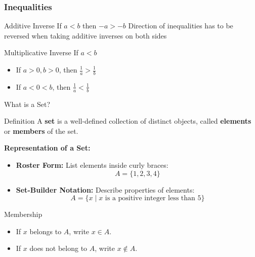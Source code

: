 \documentclass{beamer}
\begin{document}
\begin{frame}
  \frametitle{Inequalities}
  \begin{block}{Additive Inverse}
    If \( a < b \) then \( -a > -b \)
    Direction of inequalities has to be reversed when taking additive inverses on both sides 
  \end{block}
  \begin{block}{Multiplicative Inverse}
    If \( a < b \) 
    \begin{itemize}
      \item If \(a > 0, b > 0\), then \(\frac{1}{a} > \frac{1}{b} \)
      \item If \(a < 0 < b\), then \(\frac{1}{a} < \frac{1}{b} \)
    \end{itemize} 
  \end{block}

\end{frame}

\begin{frame}{What is a Set?}
  \begin{block}{Definition}
      A \textbf{set} is a well-defined collection of distinct objects, called \textbf{elements} or \textbf{members} of the set.
  \end{block}

  \vspace{10pt}

  \textbf{Representation of a Set:}
  \begin{itemize}
      \item \textbf{Roster Form:} List elements inside curly braces:
      \[
      A = \{1, 2, 3, 4\}
      \]
      \item \textbf{Set-Builder Notation:} Describe properties of elements:
      \[
      A = \{x \mid x \text{ is a positive integer less than 5}\}
      \]
  \end{itemize}

  \vspace{10pt}

  \begin{block}{Membership}
      \begin{itemize}
          \item If \(x\) belongs to \(A\), write \(x \in A\).
          \item If \(x\) does not belong to \(A\), write \(x \notin A\).
      \end{itemize}
  \end{block}
\end{frame}
\end{document}

